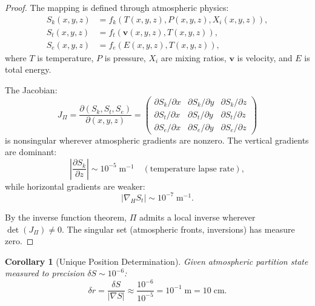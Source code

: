 \documentclass[twocolumn,10pt]{article}
\newtheorem{corollary}[theorem]{Corollary}
\theoremstyle{definition}
\newcommand{\Sk}{S_k}
\newcommand{\St}{S_t}
\newcommand{\Se}{S_e}
\begin{document}
\begin{proof}
The mapping is defined through atmospheric physics:
\begin{align}
    \Sk(x,y,z) &= f_k(T(x,y,z), P(x,y,z), X_i(x,y,z)), \label{eq:Sk_map} \\
    \St(x,y,z) &= f_t(\mathbf{v}(x,y,z), T(x,y,z)), \label{eq:St_map} \\
    \Se(x,y,z) &= f_e(E(x,y,z), T(x,y,z)), \label{eq:Se_map}
\end{align}
where $T$ is temperature, $P$ is pressure, $X_i$ are mixing ratios, $\mathbf{v}$ is velocity, and $E$ is total energy.

The Jacobian:
\begin{equation}
    J_\Pi = \frac{\partial(\Sk, \St, \Se)}{\partial(x, y, z)} = \begin{pmatrix}
    \partial\Sk/\partial x & \partial\Sk/\partial y & \partial\Sk/\partial z \\
    \partial\St/\partial x & \partial\St/\partial y & \partial\St/\partial z \\
    \partial\Se/\partial x & \partial\Se/\partial y & \partial\Se/\partial z
    \end{pmatrix}
\end{equation}
is nonsingular wherever atmospheric gradients are nonzero. The vertical gradients are dominant:
\begin{equation}
    \left|\frac{\partial\Sk}{\partial z}\right| \sim 10^{-5}\;\text{m}^{-1} \quad (\text{temperature lapse rate}),
\end{equation}
while horizontal gradients are weaker:
\begin{equation}
    |\nabla_H \St| \sim 10^{-7}\;\text{m}^{-1}.
\end{equation}

By the inverse function theorem, $\Pi$ admits a local inverse wherever $\det(J_\Pi) \neq 0$. The singular set (atmospheric fronts, inversions) has measure zero.
\end{proof}

\begin{corollary}[Unique Position Determination]\label{cor:unique_pos}
Given atmospheric partition state measured to precision $\delta S \sim 10^{-6}$:
\begin{equation}\label{eq:pos_precision}
    \delta r = \frac{\delta S}{|\nabla S|} \approx \frac{10^{-6}}{10^{-5}} = 10^{-1}\;\text{m} = 10\;\text{cm}.
\end{equation}
\end{corollary}
\end{document}
